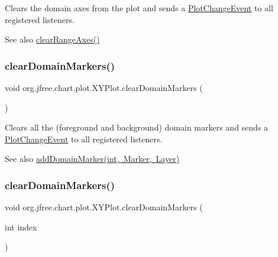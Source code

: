 Clears the domain axes from the plot and sends a \mbox{\hyperlink{}{Plot\+Change\+Event}} to all registered listeners.

\begin{DoxySeeAlso}{See also}
\mbox{\hyperlink{classorg_1_1jfree_1_1chart_1_1plot_1_1_x_y_plot_a5b2614cb3856efb052f6d4cf3b04ec13}{clear\+Range\+Axes()}} 
\end{DoxySeeAlso}
\mbox{\label{classorg_1_1jfree_1_1chart_1_1plot_1_1_x_y_plot_a0b3732025a192e27fdf6e45543d9aa4f}} 
\subsubsection{\texorpdfstring{clear\+Domain\+Markers()}{clearDomainMarkers()}\hspace{0.1cm}{\footnotesize\ttfamily [1/2]}}
{\footnotesize\ttfamily void org.\+jfree.\+chart.\+plot.\+X\+Y\+Plot.\+clear\+Domain\+Markers (\begin{DoxyParamCaption}{ }\end{DoxyParamCaption})}

Clears all the (foreground and background) domain markers and sends a \mbox{\hyperlink{}{Plot\+Change\+Event}} to all registered listeners.

\begin{DoxySeeAlso}{See also}
\mbox{\hyperlink{classorg_1_1jfree_1_1chart_1_1plot_1_1_x_y_plot_a1ce4aad5fc259b7fac498fa117ab9f6e}{add\+Domain\+Marker(int, Marker, Layer)}} 
\end{DoxySeeAlso}
\mbox{\label{classorg_1_1jfree_1_1chart_1_1plot_1_1_x_y_plot_a5ce7a15b263266b4b64868b1a27034ee}} 
\subsubsection{\texorpdfstring{clear\+Domain\+Markers()}{clearDomainMarkers()}\hspace{0.1cm}{\footnotesize\ttfamily [2/2]}}
{\footnotesize\ttfamily void org.\+jfree.\+chart.\+plot.\+X\+Y\+Plot.\+clear\+Domain\+Markers (\begin{DoxyParamCaption}\item[{int}]{index }\end{DoxyParamCaption})}

